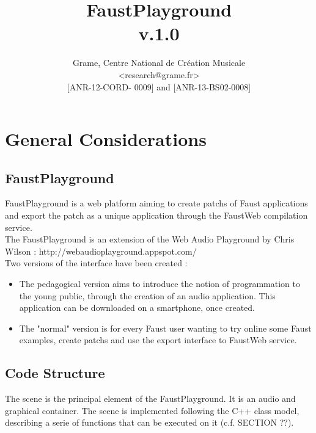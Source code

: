\documentclass[a4paper]{article}
\begin{document}
\title{FaustPlayground \\ v.1.0}

\author{Grame, Centre National de Création Musicale\\
{\small <research@grame.fr>} \\
\vspace{2mm}
[ANR-12-CORD- 0009] and [ANR-13-BS02-0008]
}

\maketitle


\newpage
\tableofcontents

\newpage
\section{General Considerations}

\subsection{FaustPlayground}
FaustPlayground is a web platform aiming to create patchs of Faust applications and export the patch as a unique application through the FaustWeb compilation service. \\

The FaustPlayground is an extension of the Web Audio Playground by Chris Wilson : http://webaudioplayground.appspot.com/ \\

Two versions of the interface have been created :
\begin{itemize}
\item The pedagogical version aims to introduce the notion of programmation to the young public, through the creation of an audio application. This application can be downloaded on a smartphone, once created.

\item The "normal" version is for every Faust user wanting to try online some  Faust examples, create patchs and use the export interface to FaustWeb service.
\end{itemize}

\subsection{Code Structure}

The scene is the principal element of the FaustPlayground. It is an audio and graphical container. The scene is implemented following the C++ class model, describing a serie of functions that can be executed on it (c.f. SECTION ??).
\end{document}
